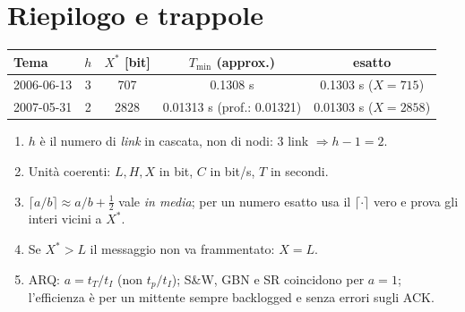 \section{Riepilogo e trappole}
\begin{center}\small
\begin{tabular}{lcccc}
\toprule
Tema & $h$ & $X^*$ [bit] & $T_{\min}$ (approx.) & esatto\\
\midrule
2006-06-13 & 3 & 707 & 0.1308 s & 0.1303 s ($X{=}715$)\\
2007-05-31 & 2 & 2828 & 0.01313 s (prof.: 0.01321) & 0.01303 s ($X{=}2858$)\\
\bottomrule
\end{tabular}
\end{center}
\begin{attenzione}
\begin{enumerate}[leftmargin=*]
\item $h$ è il numero di \emph{link} in cascata, non di nodi: 3 link $\Rightarrow h-1=2$.
\item Unità coerenti: $L,H,X$ in bit, $C$ in bit/s, $T$ in secondi.
\item $\lceil a/b\rceil\approx a/b+\tfrac12$ vale \emph{in media}; per un numero esatto usa il $\lceil\cdot\rceil$ vero e prova gli interi vicini a $X^*$.
\item Se $X^*>L$ il messaggio non va frammentato: $X=L$.
\item ARQ: $a=t_T/t_I$ (non $t_p/t_I$); S\&W, GBN e SR coincidono per $a=1$; l'efficienza è per un mittente sempre backlogged e senza errori sugli ACK.
\end{enumerate}
\end{attenzione}
